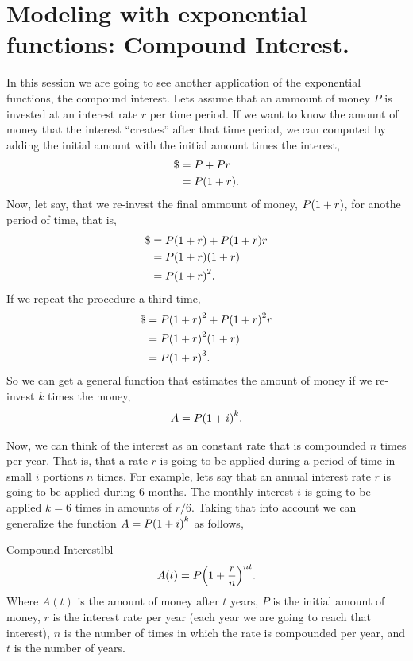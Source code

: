 \documentclass[../main.tex]{subfiles}
\begin{document}
\section{Modeling with exponential functions: Compound Interest.}

In this session we are going to see another application of the exponential functions, the compound interest.
Lets assume that an ammount of money $P$ is invested at an interest rate $r$ per time period.
If we want to know the amount of money that the interest ``creates'' after that time period, we can computed by adding the initial amount with the initial amount times the interest,
\begin{align*}
    \$ &= P + Pr \\
       &= P\qty(1+r).
\end{align*}
Now, let say, that we re-invest the final ammount of money, $P\qty(1+r)$, for anothe period of time, that is,
\begin{align*}
    \$ &= P\qty(1+r) + P\qty(1+r)r \\
       &= P\qty(1+r)\qty(1+r) \\
       &= P\qty(1+r)^2.
\end{align*}
If we repeat the procedure a third time,
\begin{align*}
    \$ &= P\qty(1+r)^2 + P\qty(1+r)^2r \\
       &= P\qty(1+r)^2\qty(1+r) \\
       &= P\qty(1+r)^3.
\end{align*}
So we can get a general function that estimates the amount of money if we re-invest $k$ times the money,
\begin{align*}
    A = P\qty(1+i)^k.
\end{align*}

Now, we can think of the interest as an constant rate that is compounded $n$ times per year.
That is, that a rate $r$ is going to be applied during a period of time in small $i$ portions $n$ times.
For example, lets say that an annual interest rate $r$ is going to be applied during 6 months.
The monthly interest $i$ is going to be applied $k=6$ times in amounts of $r/6$.
Taking that into account we can generalize the function $A = P\qty(1+i)^k$ as follows,
\begin{definition}{Compound Interest}{lbl}
    \begin{gather*}
        A(t) = P\qty(1+\frac{r}{n})^{nt}.
    \end{gather*}
    Where $A(t)$ is the amount of money after $t$ years,
    $P$ is the initial amount of money,
    $r$ is the interest rate per year (each year we are going to reach that interest),
    $n$ is the number of times in which the rate is compounded per year,
    and $t$ is the number of years.
\end{definition}
\end{document}

